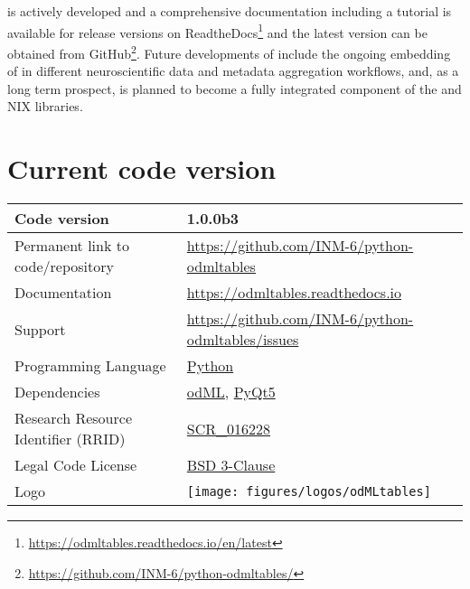  is actively developed and a comprehensive documentation including a tutorial is available for release versions on ReadtheDocs\footnote{\url{https://odmltables.readthedocs.io/en/latest}} and the latest version can be obtained from GitHub\footnote{\url{https://github.com/INM-6/python-odmltables/}}. Future developments of  include the ongoing embedding of  in different neuroscientific data and metadata aggregation workflows, and, as a long term prospect,  is planned to become a fully integrated component of the  and NIX libraries.


\section{Current code version}
\label{sec:code_version}

\begin{tabular}{ll}
\hline
Code version & 1.0.0b3 \\
\hline
Permanent link to code/repository & \href{https://github.com/INM-6/python-odmltables}{https://github.com/INM-6/python-odmltables}\\
\hline
Documentation & \href{https://odmltables.readthedocs.io}{https://odmltables.readthedocs.io}\\
\hline
Support & \href{https://github.com/INM-6/python-odmltables/issues}{https://github.com/INM-6/python-odmltables/issues}\\
\hline
Programming Language & \href{https://www.python.org/}{Python}\\
\hline
Dependencies & \href{http://g-node.github.io/python-odml/}{odML}, \href{https://wiki.python.org/moin/PyQt}{PyQt5}\\  
\hline
Research Resource Identifier (RRID) & \href{https://scicrunch.org/scicrunch/Resources/record/nlx_144509-1/SCR_016228/resolver}{SCR\_016228}\\
\hline
Legal Code License  & \href{https://github.com/INM-6/python-odmltables/blob/master/LICENSE.txt}{BSD 3-Clause} \\
\hline
Logo &
\texttt{[image: figures/logos/odMLtables]}\\
\hline
\end{tabular}

